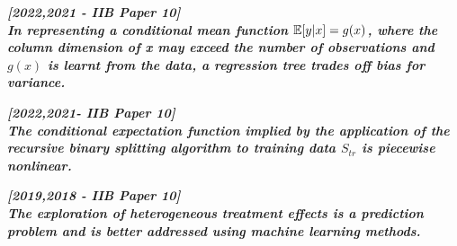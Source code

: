 \documentclass[DIV=14,titlepage=false]{scrreprt}
\begin{document}
\textbf{\textit{[2022,2021 - IIB Paper 10] \\
 In representing a conditional mean function $\mathbb{E}[y|x] = g(x)$, where the column dimension of x may exceed the number of observations and $g(x)$ is learnt from the data, a regression tree trades off bias for variance.}}

\vspace{5pt}

\textbf{\textit{[2022,2021- IIB Paper 10] \\ 
The conditional expectation function implied by the application of the recursive binary splitting algorithm to training data $S_{tr}$ is piecewise nonlinear.}}

\vspace{5pt}

\textbf{\textit{[2019,2018 - IIB Paper 10] \\
 The exploration of heterogeneous treatment effects is a prediction problem and is better addressed using machine learning methods.}}
\end{document}
